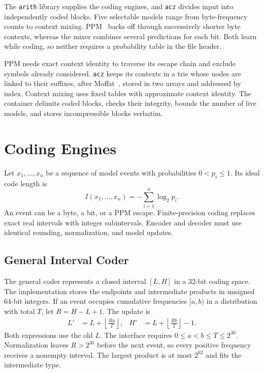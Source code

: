 \documentclass[10pt,letterpaper]{article}
\newcommand{\acz}{\texttt{acz}}
\newcommand{\arith}{\texttt{arith}}
\begin{document}
The \arith{} library supplies the coding engines, and \acz{} divides input into independently coded blocks. Five selectable models range from byte-frequency counts to context mixing. PPM~\cite{cleary} backs off through successively shorter byte contexts, whereas the mixer combines several predictions for each bit. Both learn while coding, so neither requires a probability table in the file header.

PPM needs exact context identity to traverse its escape chain and exclude symbols already considered. \acz{} keeps its contexts in a trie whose nodes are linked to their suffixes, after Moffat~\cite{moffatppm}, stored in two arrays and addressed by index. Context mixing uses fixed tables with approximate context identity. The container delimits coded blocks, checks their integrity, bounds the number of live models, and stores incompressible blocks verbatim.

\section{Coding Engines}\label{sec:coders}
Let $x_1,\ldots,x_n$ be a sequence of model events with probabilities $0<p_i\leq1$. Its ideal code length is
\begin{equation}
  I(x_1,\ldots,x_n)=-\sum_{i=1}^n\log_2 p_i.
\end{equation}
An event can be a byte, a bit, or a PPM escape. Finite-precision coding replaces exact real intervals with integer subintervals. Encoder and decoder must use identical rounding, normalization, and model updates.

\subsection{General Interval Coder}
The general coder represents a closed interval $[L,H]$ in a 32-bit coding space. The implementation stores the endpoints and intermediate products in unsigned 64-bit integers. If an event occupies cumulative frequencies $[a,b)$ in a distribution with total $T$, let $R=H-L+1$. The update is
\begin{align}
 L' &= L+\left\lfloor\frac{Ra}{T}\right\rfloor, &
 H' &= L+\left\lfloor\frac{Rb}{T}\right\rfloor-1.\label{eq:interval}
\end{align}
Both expressions use the old $L$. The interface requires $0\leq a<b\leq T\leq 2^{30}$. Normalization leaves $R>2^{30}$ before the next event, so every positive frequency receives a nonempty interval. The largest product is at most $2^{62}$ and fits the intermediate type.
\end{document}
